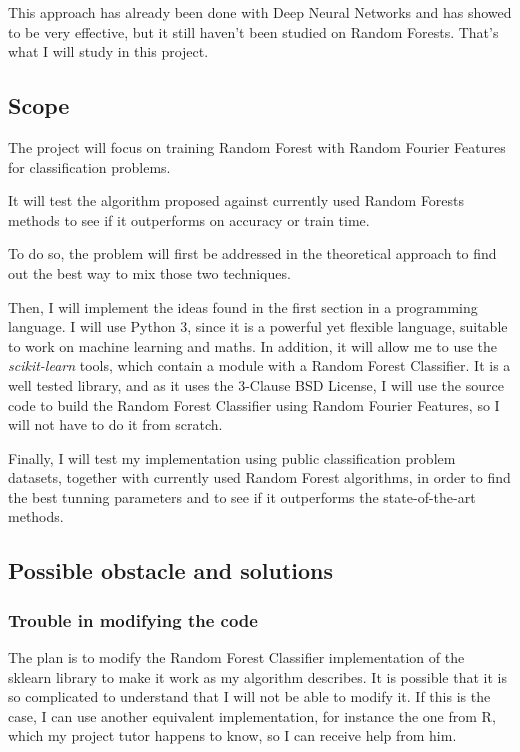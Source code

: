 \documentclass[a4paper]{article}
\begin{document}
        This approach has already been done with Deep Neural Networks\cite{RFF-NN} and has showed to be very effective, but it still haven't been studied on Random Forests. That's what I will study in this project.

        \subsection{Scope}

        The project will focus on training Random Forest with Random Fourier Features for classification problems.

        It will test the algorithm proposed against currently used Random Forests methods to see if it outperforms on accuracy or train time.

        To do so, the problem will first be addressed in the theoretical approach to find out the best way to mix those two techniques.

        Then, I will implement the ideas found in the first section in a programming language. I will use Python 3, since it is a powerful yet flexible language, suitable to work on machine learning and maths. In addition, it will allow me to use the \textit{scikit-learn} tools\cite{scikit-learn}, which contain a module with a Random Forest Classifier. It is a well tested library, and as it uses the 3-Clause BSD License, I will use the source code to build the Random Forest Classifier using Random Fourier Features, so I will not have to do it from scratch.

        Finally, I will test my implementation using public classification problem datasets, together with currently used Random Forest algorithms, in order to find the best tunning parameters and to see if it outperforms the state-of-the-art methods.

        \subsection{Possible obstacle and solutions}
            \subsubsection{Trouble in modifying the code}
            The plan is to modify the Random Forest Classifier implementation of the sklearn library to make it work as my algorithm describes. It is possible that it is so complicated to understand that I will not be able to modify it. If this is the case, I can use another equivalent implementation, for instance the one from R, which my project tutor happens to know, so I can receive help from him.
\end{document}
